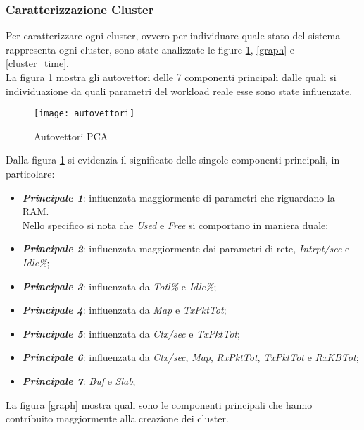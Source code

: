 \subsubsection{Caratterizzazione Cluster}

Per caratterizzare ogni cluster, ovvero per individuare quale stato del sistema
rappresenta ogni cluster, sono state analizzate le figure \ref{autovettori}, \ref{graph}
e \ref{cluster_time}.\\
La figura \ref{autovettori} mostra gli autovettori delle 7 componenti principali
dalle quali si individuazione da quali parametri del workload reale esse sono state influenzate.\\
\begin{figure}[!htbp]
  \centering
  \texttt{[image: autovettori]}
  \caption{Autovettori PCA}
  \label{autovettori}
\end{figure}

Dalla figura \ref{autovettori} si evidenzia il significato delle singole componenti
principali, in particolare:

\begin{itemize}
  \item \textbf{\textit{Principale 1}}: influenzata maggiormente di parametri che
  riguardano la RAM.\\
  Nello specifico si nota che \textit{Used} e \textit{Free} si comportano in maniera duale;
  \item \textbf{\textit{Principale 2}}: influenzata maggiormente dai parametri
  di rete, \textit{Intrpt/sec} e \textit{Idle\%};
  \item \textbf{\textit{Principale 3}}: influenzata da \textit{Totl\%} e \textit{Idle\%};
  \item \textbf{\textit{Principale 4}}: influenzata da \textit{Map} e \textit{TxPktTot};
  \item \textbf{\textit{Principale 5}}: influenzata da \textit{Ctx/sec} e \textit{TxPktTot};
  \item \textbf{\textit{Principale 6}}: influenzata da \textit{Ctx/sec}, \textit{Map},
  \textit{RxPktTot}, \textit{TxPktTot} e \textit{RxKBTot};
  \item \textbf{\textit{Principale 7}}: \textit{Buf} e \textit{Slab};
\end{itemize}

\clearpage

La figura \ref{graph} mostra quali sono le componenti principali che hanno contribuito
maggiormente alla creazione dei cluster.\\

